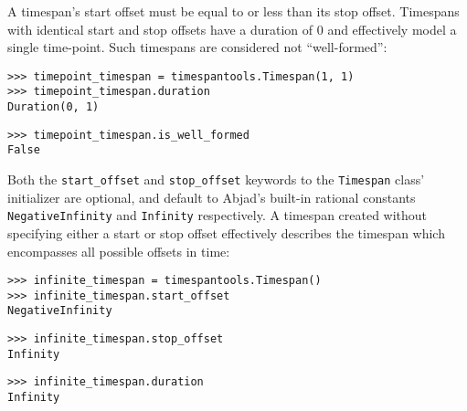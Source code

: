\noindent A timespan's start offset must be equal to or less than its stop
offset. Timespans with identical start and stop offsets have a duration of 0
and effectively model a single time-point. Such timespans are considered not
\enquote{well-formed}:

\begin{comment}
<abjad>
timepoint_timespan = timespantools.Timespan(1, 1)
timepoint_timespan.duration
timepoint_timespan.is_well_formed
</abjad>
\end{comment}

\begin{abjadbookoutput}
\begin{singlespacing}
\vspace{-0.5\baselineskip}
\begin{lstlisting}
>>> timepoint_timespan = timespantools.Timespan(1, 1)
>>> timepoint_timespan.duration
Duration(0, 1)
\end{lstlisting}
\begin{lstlisting}
>>> timepoint_timespan.is_well_formed
False
\end{lstlisting}
\end{singlespacing}
\end{abjadbookoutput}

\noindent Both the \texttt{start\_offset} and \texttt{stop\_offset} keywords to
the \texttt{Timespan} class' initializer are optional, and default to Abjad's
built-in rational constants \texttt{NegativeInfinity} and \texttt{Infinity}
respectively. A timespan created without specifying either a start or stop
offset effectively describes the timespan which encompasses all possible
offsets in time:

\begin{comment}
<abjad>
infinite_timespan = timespantools.Timespan()
infinite_timespan.start_offset
infinite_timespan.stop_offset
infinite_timespan.duration
</abjad>
\end{comment}

\begin{abjadbookoutput}
\begin{singlespacing}
\vspace{-0.5\baselineskip}
\begin{lstlisting}
>>> infinite_timespan = timespantools.Timespan()
>>> infinite_timespan.start_offset
NegativeInfinity
\end{lstlisting}
\begin{lstlisting}
>>> infinite_timespan.stop_offset
Infinity
\end{lstlisting}
\begin{lstlisting}
>>> infinite_timespan.duration
Infinity
\end{lstlisting}
\end{singlespacing}
\end{abjadbookoutput}

